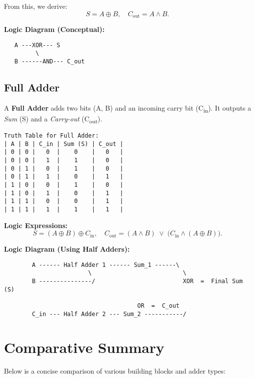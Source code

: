 \documentclass[12pt]{article}
\begin{document}
\noindent From this, we derive:
\[
  S = A \oplus B, \quad C_\text{out} = A \land B.
\]

\noindent \textbf{Logic Diagram (Conceptual):}
\begin{verbatim}
   A ---XOR--- S
         \
   B ------AND--- C_out
\end{verbatim}

\subsection{Full Adder}
A \textbf{Full Adder} adds two bits (A, B) and an incoming carry bit (C\textsubscript{in}). It outputs a \textit{Sum} (S) and a \textit{Carry-out} (C\textsubscript{out}).

\begin{verbatim}
Truth Table for Full Adder:
| A | B | C_in | Sum (S) | C_out |
| 0 | 0 |   0  |    0    |   0   |
| 0 | 0 |   1  |    1    |   0   |
| 0 | 1 |   0  |    1    |   0   |
| 0 | 1 |   1  |    0    |   1   |
| 1 | 0 |   0  |    1    |   0   |
| 1 | 0 |   1  |    0    |   1   |
| 1 | 1 |   0  |    0    |   1   |
| 1 | 1 |   1  |    1    |   1   |
\end{verbatim}

\noindent \textbf{Logic Expressions:}
\[
  S = (A \oplus B) \oplus C_\text{in}, \quad
  C_\text{out} = (A \land B) \;\lor\; \bigl(C_\text{in} \land (A \oplus B)\bigr).
\]

\noindent \textbf{Logic Diagram (Using Half Adders):}
\begin{verbatim}
        A ------ Half Adder 1 ------ Sum_1 ------\
                        \                          \
        B ---------------/                         XOR  =  Final Sum (S)
                                                      
                                      OR  =  C_out
        C_in --- Half Adder 2 --- Sum_2 -----------/
\end{verbatim}

\section{Comparative Summary}
Below is a concise comparison of various building blocks and adder types:
\end{document}
